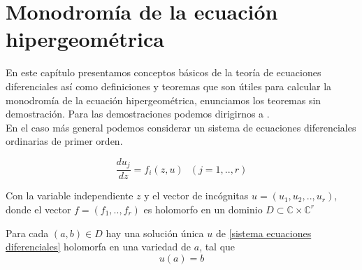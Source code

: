 


%


\chapter{Monodrom\'ia de la ecuaci\'on hipergeom\'etrica}
\label{cha:State of the Art}





En este cap\'itulo presentamos conceptos b\'asicos de la teor\'ia de ecuaciones diferenciales as\'i como definiciones y teoremas que son \'utiles para calcular la monodrom\'ia de la ecuaci\'on hipergeom\'etrica, enunciamos los teoremas sin demostraci\'on. Para las demostraciones podemos dirigirnos a \cite{gausspainleve}. \\

 En el caso m\'as general podemos considerar un sistema de ecuaciones diferenciales ordinarias de primer orden.

\begin{equation} \label{sistema ecuaciones diferenciales}
\frac{du_{j}}{dz} = f_{i}(z,u) \ \ \  (j=1,..,r)
\end{equation}

Con la variable independiente $z$ y el vector de inc\'ognitas $u=(u_{1},u_{2},..,u_{r})$, donde el vector $f=(f_{1},..,f_{r})$ es holomorfo en un dominio $D \subset \mathbb{C} \times \mathbb{C}^{r}$

\begin{thm} Para cada $(a,b) \in D $ hay una soluci\'on \'unica $u$ de \ref{sistema ecuaciones diferenciales} holomorfa en una variedad de $a$, tal que
\begin{equation} \label{u(a)=b}
 u(a)=b
\end{equation}
\end{thm}

